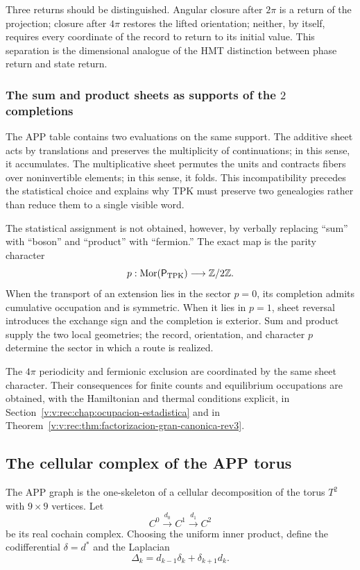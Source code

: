 Three returns should be distinguished. Angular closure after \(2\pi\) is a
return of the projection; closure after \(4\pi\) restores the lifted
orientation; neither, by itself, requires every coordinate of the record
to return to its initial value. This separation is the dimensional analogue of the
HMT distinction between phase return and state return.

\subsubsection{The sum and product sheets as supports of the \(2\) completions}
\label{v:v:rec:completaciones:section:06}

The APP table contains two evaluations on the same support. The
additive sheet acts by translations and preserves the multiplicity of
continuations; in this sense, it accumulates. The multiplicative sheet
permutes the units and contracts fibers over noninvertible elements; in
this sense, it folds. This incompatibility precedes the statistical
choice and explains why TPK must preserve two genealogies rather than
reduce them to a single visible word.

The statistical assignment is not obtained, however, by verbally replacing
``sum'' with ``boson'' and ``product'' with ``fermion.'' The exact map is
the parity character
\[
 p:\operatorname{Mor}(\mathsf P_{\rm TPK})\longrightarrow\mathbb Z/2\mathbb Z.
\]
When the transport of an extension lies in the sector \(p=0\), its
completion admits cumulative occupation and is symmetric. When it lies in
\(p=1\), sheet reversal introduces the exchange sign and the
completion is exterior. Sum and product supply the two
local geometries; the record, orientation, and character \(p\) determine the
sector in which a route is realized.

The \(4\pi\) periodicity and fermionic exclusion are coordinated by
the same sheet character. Their consequences for finite counts and
equilibrium occupations are obtained, with the Hamiltonian and thermal
conditions explicit, in
Section~\ref{v:v:rec:chap:ocupacion-estadistica} and in
Theorem~\ref{v:v:rec:thm:factorizacion-gran-canonica-rev3}.

\subsection{The cellular complex of the APP torus}
\label{v:v:rec:completaciones:section:08}

The APP graph is the one-skeleton of a cellular decomposition of the torus
\(T^2\) with \(9\times9\) vertices. Let
\[
 C^0\xrightarrow{d_0}C^1\xrightarrow{d_1}C^2
\]
be its real cochain complex. Choosing the uniform inner product,
define the codifferential \(\delta=d^*\) and the Laplacian
\[
 \Delta_k=d_{k-1}\delta_k+\delta_{k+1}d_k.
\]

